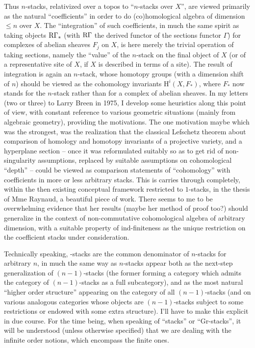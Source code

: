 Thus $n$-stacks, relativized over a topos to ``$n$-stacks over $X$'',
are viewed primarily as the natural ``coefficients'' in order to do
(co)homological algebra of dimension $\le n$ over $X$. The
``integration'' of such coefficients, in much the same spirit as
taking objects $\operatorname{R\Gamma}_*$ (with $\operatorname{R\Gamma}$ the derived functor of the
sections functor $\Gamma$) for complexes of abelian sheaves $F_j$ on
$X$, is here merely the trivial operation of taking sections, namely
the ``value'' of the $n$-stack on the final object of $X$ (or of a
representative site of $X$, if $X$ is described in terms of a
site). The result of integration is again an $n$-stack, whose homotopy
groups (with a dimension shift of $n$) should be viewed as the
cohomology invariants $\mathrm H^i(X,F_*)$, where $F_*$ now stands for the
$n$-stack rather than for a complex of abelian sheaves. In my letters
(two or three) to Larry Breen in 1975, I develop some heuristics along
this point of view, with constant reference to various geometric
situations (mainly from algebraic geometry), providing the
motivations. The one motivation maybe which was the strongest, was the
realization that the classical Lefschetz theorem about comparison of
homology and homotopy invariants of a projective variety, and a
hyperplane section -- once it was reformulated suitably so as to get
rid of non-singularity assumptions, replaced by suitable assumptions
on cohomological ``depth'' -- could be viewed as comparison statements
of ``cohomology'' with coefficients in more or less arbitrary
stacks. This is carries through completely, within the then existing
conceptual framework restricted to $1$-stacks, in the thesis of Mme
Raynaud, a beautiful piece of work. There seems to me to be
overwhelming evidence that her results (maybe her method of proof
too?) should generalize in the context of non-commutative
cohomological algebra of arbitrary dimension, with a suitable property
of ind-finiteness as the unique restriction on the
coefficient stacks under consideration.

Technically speaking, \oo-stacks are the common denominator of
$n$-stacks for arbitrary $n$, in much the same way as $n$-stacks
appear both as the next-step generalization of $(n-1)$-stacks (the
former forming a category which admits the category of $(n-1)$-stacks
as a full subcategory), and as the most natural ``higher order
structure'' appearing on the category of all $(n-1)$-stacks (and on
various analogous categories whose objects are $(n-1)$-stacks subject
to some restrictions or endowed with some extra structure). I'll have
to make this explicit in due course. For the time being, when speaking
of ``stacks'' or ``Gr-stacks'', it will be understood (unless
otherwise specified) that we are dealing with the infinite order
notions, which encompass the finite ones.

